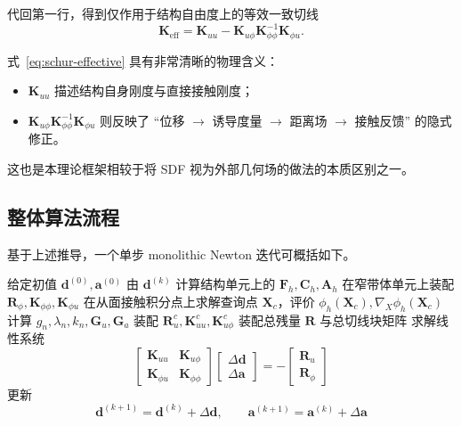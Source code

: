 \documentclass[12pt,a4paper]{ctexart}
\numberwithin{equation}{section}
\newcommand{\bA}{\bm{A}}
\newcommand{\bC}{\bm{C}}
\newcommand{\bF}{\bm{F}}
\newcommand{\bd}{\bm{d}}
\newcommand{\ba}{\bm{a}}
\newcommand{\bX}{\bm{X}}
\newcommand{\gradX}{\nabla_{\!X}}
\begin{document}
代回第一行，得到仅作用于结构自由度上的等效一致切线
\begin{equation}
\boxed{
\bm{K}_{\mathrm{eff}}
=
\bm{K}_{uu} - \bm{K}_{u\phi}\bm{K}_{\phi\phi}^{-1}\bm{K}_{\phi u}.
}
\label{eq:schur-effective}
\end{equation}

式~\eqref{eq:schur-effective} 具有非常清晰的物理含义：
\begin{itemize}
    \item $\bm{K}_{uu}$ 描述结构自身刚度与直接接触刚度；
    \item $\bm{K}_{u\phi}\bm{K}_{\phi\phi}^{-1}\bm{K}_{\phi u}$ 则反映了 ``位移 $\to$ 诱导度量 $\to$ 距离场 $\to$ 接触反馈'' 的隐式修正。
\end{itemize}

这也是本理论框架相较于将 SDF 视为外部几何场的做法的本质区别之一。

\subsection{整体算法流程}

基于上述推导，一个单步 monolithic Newton 迭代可概括如下。

\begin{algorithm}[H]
\caption{结构位移--pull-back SDF 耦合的 monolithic Newton 算法}
\begin{algorithmic}[1]
\State 给定初值 $\bd^{(0)},\ba^{(0)}$
    \State 由 $\bd^{(k)}$ 计算结构单元上的 $\bF_h,\bC_h,\bA_h$
    \State 在窄带体单元上装配 $\bm{R}_\phi,\bm{K}_{\phi\phi},\bm{K}_{\phi u}$
    \State 在从面接触积分点上求解查询点 $\bX_c$，评价 $\phi_h(\bX_c),\gradX\phi_h(\bX_c)$
    \State 计算 $g_n,\lambda_n,k_n,\bm{G}_u,\bm{G}_a$
    \State 装配 $\bm{R}_u^c,\bm{K}_{uu}^c,\bm{K}_{u\phi}^c$
    \State 装配总残量 $\bm{R}$ 与总切线块矩阵
    \State 求解线性系统
    \[
    \begin{bmatrix}
    \bm{K}_{uu} & \bm{K}_{u\phi}\\
    \bm{K}_{\phi u} & \bm{K}_{\phi\phi}
    \end{bmatrix}
    \begin{bmatrix}
    \Delta\bd\\
    \Delta\ba
    \end{bmatrix}
    =-
    \begin{bmatrix}
    \bm{R}_u\\
    \bm{R}_\phi
    \end{bmatrix}
    \]
    \State 更新
    \[
    \bd^{(k+1)}=\bd^{(k)}+\Delta\bd,
    \qquad
    \ba^{(k+1)}=\ba^{(k)}+\Delta\ba
    \]
\EndFor
\end{algorithmic}
\end{algorithm}
\end{document}

